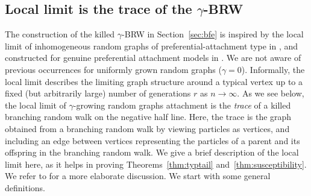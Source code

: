 \documentclass[a4paper, a4wide, 10pt, reqno]{amsart}
\theoremstyle{plain}
\theoremstyle{definition}
\numberwithin{equation}{section}
\begin{document}
\subsection{Local limit is the trace of the $\gamma$-BRW}\label{sec:local}
The construction of the killed $\gamma$-BRW in Section~\ref{sec:bfe} is inspired by the  local limit of inhomogeneous random graphs of preferential-attachment type in \cite{morters2023tangent},  and constructed for genuine preferential attachment models in \cite{BBCSLocalLimitPA,DerMor13, garavaglia2022universality}. We are not aware of previous occurrences for uniformly grown random graphs ($\gamma=0$). Informally, the local limit describes the limiting graph structure around a typical vertex up to a fixed (but arbitrarily large) number of generations $r$ as $n\to\infty$. As we see below, the local limit of $\gamma$-growing random graphs attachment is the \emph{trace} of a killed branching random walk on the negative half line. Here, the trace is the graph obtained from a branching random walk by viewing particles as vertices, and including an edge between vertices representing the particles of a parent and its offspring in the branching random walk. 
We give a brief description of the local limit here, as it helps in proving Theorems~\ref{thm:typtail} and~\ref{thm:susceptibility}. We refer to \cite{vdH2} for a more elaborate discussion. We start with some general definitions.
\smallskip 
\end{document}
